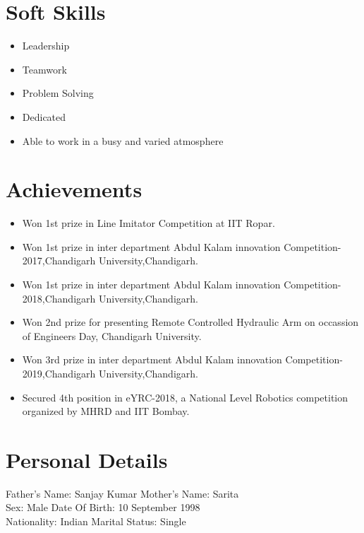 \documentclass[10pt,a4paper,sans]{moderncv} %
\begin{document}
\section{Soft Skills}
\begin{itemize}
\item Leadership              
\item Teamwork
\item Problem Solving
\item Dedicated
\item Able to work in a busy and varied atmosphere
\end {itemize}



\section{Achievements}

\begin{itemize}
\item Won 1st  prize in Line Imitator Competition at IIT Ropar.



\item Won 1st prize in inter department Abdul Kalam innovation Competition- 2017,Chandigarh University,Chandigarh.
\item Won 1st prize in inter department Abdul Kalam innovation Competition- 2018,Chandigarh University,Chandigarh.
\item Won 2nd prize for presenting Remote Controlled Hydraulic Arm on occassion of Engineers Day,
Chandigarh University.
\item Won 3rd prize in inter department Abdul Kalam innovation Competition- 2019,Chandigarh University,Chandigarh.

\item Secured 4th position in eYRC-2018, a National Level Robotics competition organized by MHRD and IIT Bombay.
\end {itemize}






\section{Personal Details}
Father's Name: Sanjay Kumar 	\hspace{3.35cm}		Mother's Name: Sarita \\
Sex: Male 				\hspace{6.35cm}		Date Of Birth: 10 September 1998 \\
Nationality: Indian			\hspace{5.08cm}		Marital Status: Single
\end{document}
